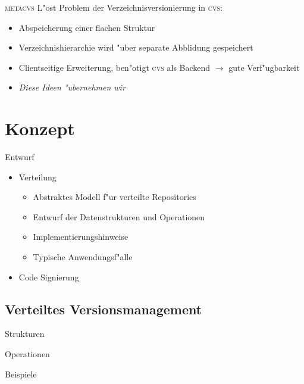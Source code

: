 \documentclass[german]{beamer}
\newcommand{\METACVS}{\textsc{metacvs}}
\newcommand{\CVS}{\textsc{cvs}}
\begin{document}
\begin{frame}{\METACVS}
  L"ost Problem der Verzeichnisversionierung in \CVS:
  \begin{itemize}
  \item Abspeicherung einer flachen Struktur
  \item Verzeichnishierarchie wird "uber separate Abblidung
    gespeichert
  \item Clientseitige Erweiterung, ben"otigt \CVS{} als Backend
    $\rightarrow$ gute Verf"ugbarkeit
  \item \emph{Diese Ideen "ubernehmen wir}
  \end{itemize}
\end{frame}

\section{Konzept}

\begin{frame}{Entwurf}
  \begin{itemize}
  \item Verteilung
    \begin{itemize}
    \item Abstraktes Modell f"ur verteilte Repositories
    \item Entwurf der Datenstrukturen und Operationen
    \item Implementierungshinweise
    \item Typische Anwendungsf"alle
    \end{itemize}
  \item Code Signierung
  \end{itemize}
\end{frame}

\subsection{Verteiltes Versionsmanagement}

\begin{frame}{Strukturen}
  
\end{frame}

\begin{frame}{Operationen}
  
\end{frame}

\begin{frame}{Beispiele}

\end{frame}
\end{document}
